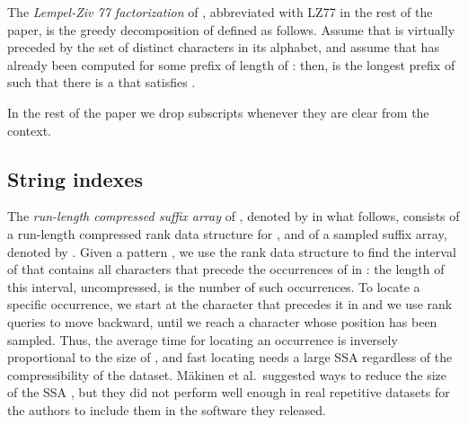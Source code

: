 \documentclass[a4paper,UKenglish]{lipics-v2016}
\begin{document}
The \emph{Lempel-Ziv 77 factorization} of  \cite{ziv1977universal}, abbreviated with LZ77 in the rest of the paper, is the greedy decomposition  of  defined as follows. Assume that  is virtually preceded by the set of distinct characters in its alphabet, and assume that  has already been computed for some prefix of length  of : then,  is the longest prefix of  such that there is a  that satisfies . 

In the rest of the paper we drop subscripts whenever they are clear from the context.









































\subsection{String indexes} \label{sec:stringIndexes}

The \emph{run-length compressed suffix array} of , denoted by  in what follows, consists of a run-length compressed rank data structure for , and of a sampled suffix array, denoted by  \cite{MakinenNSV10}. Given a pattern , we use the rank data structure to find the interval of  that contains all characters that precede the occurrences of  in : the length of this interval, uncompressed, is the number of such occurrences. To locate a specific occurrence, we start at the character that precedes it in  and we use rank queries to move backward, until we reach a character whose position has been sampled. Thus, the average time for locating an occurrence is inversely proportional to the size of , and fast locating needs a large SSA regardless of the compressibility of the dataset. M\"akinen et al.\ suggested ways to reduce the size of the SSA \cite{MakinenNSV10}, but they did not perform well enough in real repetitive datasets for the authors to include them in the software they released.
\end{document}
